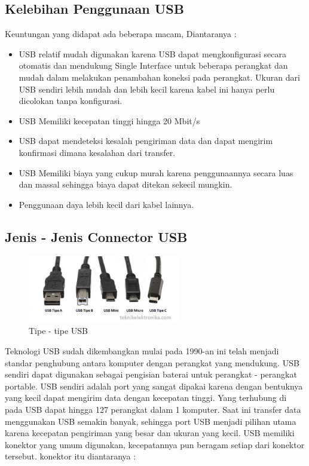 \subsection{Kelebihan Penggunaan USB}
Keuntungan yang didapat ada beberapa macam, Diantaranya : 
\begin{itemize} 
\item USB relatif mudah digunakan karena USB dapat mengkonfigurasi secara otomatis dan mendukung Single Interface untuk beberapa perangkat dan mudah dalam melakukan penambahan koneksi pada perangkat. Ukuran dari USB sendiri lebih mudah dan lebih kecil karena kabel ini hanya perlu dicolokan tanpa konfigurasi.
\item USB Memiliki kecepatan tinggi hingga 20 Mbit/s
\item USB dapat mendeteksi kesalah pengiriman data dan dapat mengirim konfirmasi dimana kesalahan dari transfer.
\item USB Memiliki biaya yang cukup murah karena penggunaannya secara luas dan massal sehingga biaya dapat ditekan sekecil mungkin.
\item Penggunaan daya lebih kecil dari kabel lainnya.
\end{itemize}
\subsection{Jenis - Jenis Connector USB}
\begin{figure}[ht]
\centerline{\includegraphics[width=0.6\textwidth]{figures/tipeusb.jpg}}
\caption{Tipe - tipe USB}
\label{tipeusb}
\end{figure}
Teknologi USB sudah dikembangkan mulai pada 1990-an ini telah menjadi standar penghubung antara komputer dengan perangkat yang mendukung. USB sendiri dapat digunakan sebagai pengisian baterai untuk perangkat - perangkat portable.
USB sendiri adalah port yang sangat dipakai karena dengan bentuknya yang kecil dapat mengirim data dengan kecepatan tinggi. Yang terhubung di pada USB dapat hingga 127 perangkat dalam 1 komputer. Saat ini transfer data menggunakan USB semakin banyak, sehingga port USB menjadi pilihan utama karena kecepatan pengiriman yang besar dan ukuran yang kecil. 
USB memiliki konektor yang umum digunakan, kecepatannya pun beragam setiap dari konektor tersebut. konektor itu diantaranya : 
